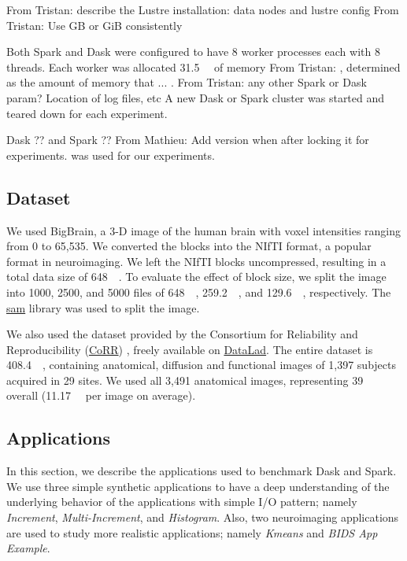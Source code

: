 \documentclass[conference]{IEEEtran}
\newcommand{\TG}[1]{\color{cyan}From Tristan: #1 \color{black}}
\newcommand{\MD}[1]{\color{magenta}From Mathieu: #1 \color{black}}
\begin{document}
\TG{describe the Lustre installation: data nodes and lustre config}
\TG{Use GB or GiB consistently}

Both Spark and Dask were configured to have 8 worker processes each with 8
threads. Each worker was allocated \SI{31.5}{\giga\byte} of memory \TG{,
	determined as the amount of memory that ...}. \TG{any other Spark or Dask
param? Location of log files, etc} A new Dask or Spark cluster was started and
teared down for each experiment.

Dask ?? and Spark ?? \MD{Add version when after locking it for experiments.} was used for our experiments.

\subsection{Dataset}
We used BigBrain\cite{Amunts:13}, a 3-D image of the human brain with voxel
intensities ranging from 0 to 65,535. We converted the blocks into the
NIfTI format, a popular format in neuroimaging. We left the NIfTI blocks
uncompressed, resulting in a total data size of \SI{648}{\giga\byte}. To
evaluate the effect of block size, we split the image into 1000, 2500,
and 5000 files of \SI{648}{\mega\byte}, \SI{259.2}{\mega\byte}, and
\SI{129.6}{\mega\byte}, respectively. The
\href{https://github.com/big-data-lab-team/sam}{sam} library was used to
split the image.

We also used the dataset provided by the Consortium for Reliability and
Reproducibility
(\href{http://fcon_1000.projects.nitrc.org/indi/CoRR/html/}{CoRR})
\cite{zuo2014open}, freely available on
\href{https://datasets.datalad.org/?dir=/corr/RawDataBIDS}{DataLad}. The
entire dataset is \SI{408.4}{\giga\byte}, containing anatomical, diffusion
and functional images of 1,397 subjects acquired in 29 sites. We used all
3,491 anatomical images, representing \SI{39}{\giga\byte} overall
(\SI{11.17}{\mega\byte} per image on average).

\subsection{Applications}
In this section, we describe the applications used to benchmark Dask and Spark.
We use three simple synthetic applications to have a deep understanding of the 
underlying behavior of the applications with simple I/O pattern; namely
\textit{Increment}, \textit{Multi-Increment}, and \textit{Histogram}.
Also, two neuroimaging applications are used to study more realistic 
applications; namely \textit{Kmeans} and \textit{BIDS App Example}.
\end{document}

